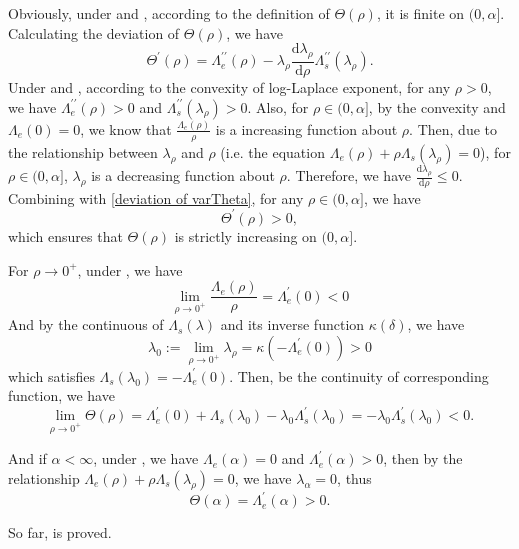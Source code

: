 \documentclass[]{article}
\makeatletter
\numberwithin{equation}{section}
\renewenvironment{proof}[1][\proofname]{%
	\par\pushQED{\qed}\normalfont%
	\topsep6\p@\@plus6\p@\relax
	\trivlist\item[\hskip\labelsep\bfseries#1\@addpunct{.}]%
	\ignorespaces
}{%
	\popQED\endtrivlist\@endpefalse
}
\theoremstyle{thmstyleone}%
\theoremstyle{thmstyletwo}%
\theoremstyle{thmstylethree}%
\theoremstyle{thmstylefour}%
\theoremstyle{thmstylefive}%
\theoremstyle{thmstylesix}%
\renewcommand{\d}{\mathrm{d}}
\makeatother
\begin{document}
	\begin{proof}
		Obviously, under and , according to the definition of $\varTheta(\rho)$, it is finite on $(0,\alpha]$.
		Calculating the deviation of $\varTheta(\rho)$, we have
		\begin{equation}\label{deviation of varTheta}
			\varTheta^\prime(\rho)
			= \Lambda_e^{\prime\prime}(\rho)-\lambda_\rho \frac{\d \lambda_\rho}{\d \rho}\Lambda_s^{\prime\prime}(\lambda_\rho).
		\end{equation}
		Under  and , according to the convexity of log-Laplace exponent, for any $\rho>0$, we have
		$ \Lambda_e^{\prime\prime}(\rho)>0$ and $ \Lambda_s^{\prime\prime}(\lambda_\rho)>0 $.
		Also, for $\rho\in(0,\alpha]$,  by the convexity and $\Lambda_e(0)=0$, we know that $ \frac{\Lambda_e(\rho)}{\rho} $ is a increasing function about $\rho$. Then, due to the relationship between $\lambda_\rho$ and $\rho$ (i.e. the equation $\Lambda_e(\rho)+ \rho \Lambda_s(\lambda_\rho)=0$), for $\rho\in (0,\alpha]$, $\lambda_\rho$ is a decreasing function about $\rho$. Therefore, we have $\frac{\d \lambda_\rho}{\d \rho}\leqslant 0$.
		Combining with \cref{deviation of varTheta}, for any $\rho\in (0,\alpha]$, we have
		\begin{equation}
			\varTheta^\prime(\rho)>0,
		\end{equation}
		which ensures that $\varTheta(\rho)$ is strictly increasing on $(0,\alpha]$.
		
		For $\rho\rightarrow 0^+$, under , we have
		\begin{equation}
			\lim\limits_{\rho\rightarrow 0^+} \frac{\Lambda_e(\rho)}{\rho}
			=\Lambda_e^{\prime}(0)<0
		\end{equation}
		And by the continuous of $\Lambda_s(\lambda)$ and its inverse function $ \kappa(\delta) $, we have
		\begin{equation}
			\lambda_0:=\lim\limits_{\rho\rightarrow 0^+} \lambda_\rho = \kappa(-\Lambda_e^\prime(0))>0
		\end{equation}
		which satisfies $\Lambda_s(\lambda_0) = -\Lambda_e^{\prime}(0)$.
		Then, be the continuity of corresponding function, we have
		\begin{equation}
			\lim\limits_{\rho\rightarrow 0^+} \varTheta(\rho)
			=
			\Lambda_e^{\prime}(0) +  \Lambda_s(\lambda_0)
			-\lambda_0 \Lambda_s^\prime(\lambda_0)
			= -\lambda_0 \Lambda_s^\prime(\lambda_0)<0.
		\end{equation}
		
		And if $\alpha<\infty$, under , we have $\Lambda_e(\alpha)=0$ and $\Lambda_e^\prime(\alpha)>0$, then by the relationship $\Lambda_e(\rho)+ \rho \Lambda_s(\lambda_\rho)=0$, we have $\lambda_\alpha = 0$, thus
		\begin{equation}
			\varTheta(\alpha) = \Lambda_e^\prime(\alpha)>0.
		\end{equation}
		
		So far,  is proved.
	\end{proof}
	
\end{document}
